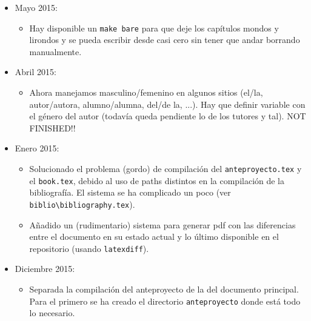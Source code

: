 \documentclass[spanish,openright]{book}
\begin{document}
\begin{appendices}
\begin{itemize}
\item Mayo 2015:
  \begin{itemize}
  \item Hay disponible un \texttt{make bare} para que deje los capítulos
    mondos y lirondos y se pueda escribir desde casi cero sin tener que
    andar borrando manualmente.
  \end{itemize}


\item Abril 2015:
  \begin{itemize}
  \item Ahora manejamos masculino/femenino en algunos sitios (el/la,
    autor/autora, alumno/alumna, del/de la, ...). Hay que definir
    variable con el género del autor (todavía queda pendiente lo de los
    tutores y tal). NOT FINISHED!!
  \end{itemize}


\item Enero 2015:
  \begin{itemize}
  \item Solucionado el problema (gordo) de compilación del
    \texttt{anteproyecto.tex} y el \texttt{book.tex}, debido al uso de
    paths distintos en la compilación de la bibliografía. El sistema se ha
    complicado un poco (ver
    \texttt{biblio\textbackslash{}bibliography.tex}).
  \item Añadido un (rudimentario) sistema para generar pdf con las
    diferencias entre el documento en su estado actual y lo último
    disponible en el repositorio (usando \texttt{latexdiff}).
  \end{itemize}
\item Diciembre 2015:
  \begin{itemize}
  \item Separada la compilación del anteproyecto de la del documento
    principal. Para el primero se ha creado el directorio
    \texttt{anteproyecto} donde está todo lo necesario.
  \end{itemize}
\end{itemize}




 \end{appendices}


\backmatter                                       
\end{document}
